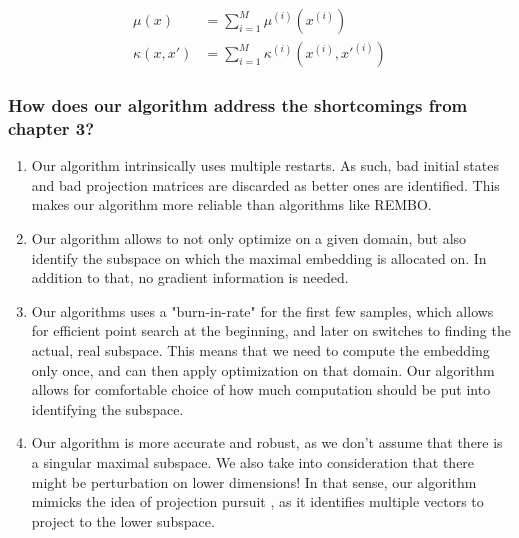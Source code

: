 
\begin{align}
\mu(x) &= \sum_{i=1}^{M} \mu^{(i)} ( x^{(i)} ) \\
\kappa(x, x') &= \sum_{i=1}^{M} \kappa^{(i)} ( x^{(i)}, x'^{(i)}  )
\end{align}


\subsubsection{How does our algorithm address the shortcomings from chapter 3?}

\begin{enumerate}
\item Our algorithm intrinsically uses multiple restarts.
As such, bad initial states and bad projection matrices are discarded as better ones are identified.
This makes our algorithm more reliable than algorithms like REMBO.
\item Our algorithm allows to not only optimize on a given domain, but also identify the subspace on which the maximal embedding is allocated on.
In addition to that, no gradient information is needed.
\item Our algorithms uses a "burn-in-rate" for the first few samples, which allows for efficient point search at the beginning, and later on switches to finding the actual, real subspace.
This means that we need to compute the embedding only once, and can then apply optimization on that domain.
Our algorithm allows for comfortable choice of how much computation should be put into identifying the subspace.
\item Our algorithm is more accurate and robust, as we don't assume that there is a singular maximal subspace. 
We also take into consideration that there might be perturbation on lower dimensions!
In that sense, our algorithm mimicks the idea of projection pursuit \citep{ProjectionPursuit}, as it identifies multiple vectors to project to the lower subspace.
\end{enumerate}


